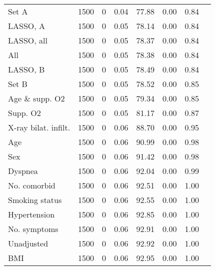 \documentclass{article}
\begin{document}
{\begin{longtable}{lccccccc}
Set A & 1500 & 0 & 0.04 & 77.88 & 0.00 & 0.84\\
LASSO, A & 1500 & 0 & 0.05 & 78.14 & 0.00 & 0.84\\
LASSO, all & 1500 & 0 & 0.05 & 78.37 & 0.00 & 0.84\\
All & 1500 & 0 & 0.05 & 78.38 & 0.00 & 0.84\\
LASSO, B & 1500 & 0 & 0.05 & 78.49 & 0.00 & 0.84\\
Set B & 1500 & 0 & 0.05 & 78.52 & 0.00 & 0.85\\
Age \& supp. O2 & 1500 & 0 & 0.05 & 79.34 & 0.00 & 0.85\\
Supp. O2 & 1500 & 0 & 0.05 & 81.17 & 0.00 & 0.87\\
X-ray bilat. infilt. & 1500 & 0 & 0.06 & 88.70 & 0.00 & 0.95\\
Age & 1500 & 0 & 0.06 & 90.99 & 0.00 & 0.98\\
Sex & 1500 & 0 & 0.06 & 91.42 & 0.00 & 0.98\\
Dyspnea & 1500 & 0 & 0.06 & 92.04 & 0.00 & 0.99\\
No. comorbid & 1500 & 0 & 0.06 & 92.51 & 0.00 & 1.00\\
Smoking status & 1500 & 0 & 0.06 & 92.55 & 0.00 & 1.00\\
Hypertension & 1500 & 0 & 0.06 & 92.85 & 0.00 & 1.00\\
No. symptoms & 1500 & 0 & 0.06 & 92.91 & 0.00 & 1.00\\
Unadjusted & 1500 & 0 & 0.06 & 92.92 & 0.00 & 1.00\\
BMI & 1500 & 0 & 0.06 & 92.95 & 0.00 & 1.00\\\bottomrule
\hline
\end{longtable}
}

\clearpage
\end{document}
